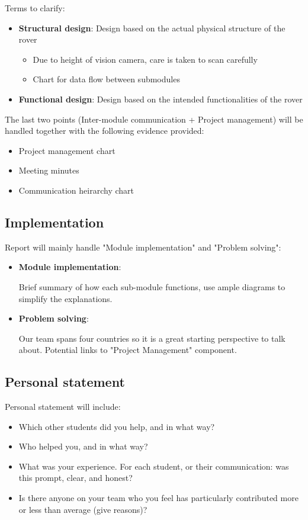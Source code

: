 \documentclass[10pt, a4paper]{article}
\begin{document}
Terms to clarify:
\begin{itemize}
    \item \textbf{Structural design}: Design based on the actual physical structure of the rover 
    \begin{itemize}
        \item Due to height of vision camera, care is taken to scan carefully 
        \item Chart for data flow between submodules
    \end{itemize}
    \item \textbf{Functional design}: Design based on the intended functionalities of the rover 
\end{itemize}

The last two points (Inter-module communication + Project management) will be handled together with the following evidence provided:
\begin{itemize}
    \item Project management chart
    \item Meeting minutes 
    \item Communication heirarchy chart 
\end{itemize}

\subsection{Implementation}

Report will mainly handle "Module implementation" and "Problem solving":
\begin{itemize}
    \item \textbf{Module implementation}:
    
    Brief summary of how each sub-module functions, use ample diagrams to simplify the explanations.

    \item \textbf{Problem solving}: 
    
    Our team spans four countries so it is a great starting perspective to talk about. Potential links to "Project Management" component.
\end{itemize}

\pagebreak

\subsection{Personal statement}

Personal statement will include:
\begin{itemize}
    \item Which other students did you help, and in what way?
    \item Who helped you, and in what way?
    \item What was your experience. For each student, or their communication: was this prompt, clear, and honest?
    \item Is there anyone on your team who you feel has particularly contributed more or less than average (give reasons)?
\end{itemize}


\end{document}
